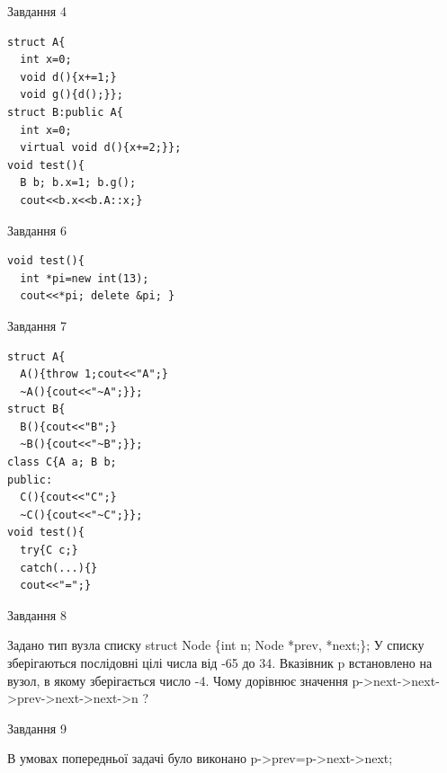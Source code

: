 \documentclass[12pt, ukrainian]{article}
\begin{document}
{{{{{{\begin{minipage}[t]{7cm}
{\begin{center}Завдання {4}\end{center}}
\vspace{-6mm}

\begin{verbatim}
struct A{
  int x=0;
  void d(){x+=1;}
  void g(){d();}};
struct B:public A{
  int x=0;
  virtual void d(){x+=2;}};
void test(){
  B b; b.x=1; b.g();
  cout<<b.x<<b.A::x;}
\end{verbatim}            


               
{\begin{center}Завдання {6}\end{center}}
\vspace{-6mm}

\begin{verbatim}
void test(){
  int *pi=new int(13);
  cout<<*pi; delete &pi; }
\end{verbatim}            


               
{\begin{center}Завдання {7}\end{center}}
\vspace{-6mm}

\begin{verbatim}
struct A{
  A(){throw 1;cout<<"A";}
  ~A(){cout<<"~A";}};
struct B{
  B(){cout<<"B";}
  ~B(){cout<<"~B";}};
class C{A a; B b;
public:
  C(){cout<<"C";}
  ~C(){cout<<"~C";}};
void test(){
  try{C c;} 
  catch(...){} 
  cout<<"=";}
\end{verbatim}            


\end{minipage}
               
{\begin{center}Завдання {8}\end{center}}
\vspace{-6mm}
Задано тип вузла списку
struct Node \{int n; Node *prev, *next;\};
У списку зберігаються послідовні цілі числа від -65 до 34. Вказівник p встановлено на вузол, в якому зберігається число -4.
Чому дорівнює значення p->next->next->prev->next->next->n ?\par

               
{\begin{center}Завдання {9}\end{center}}
\vspace{-6mm}
В умовах попередньої задачі було виконано p->prev=p->next->next;

}}}}}}
\end{document}

